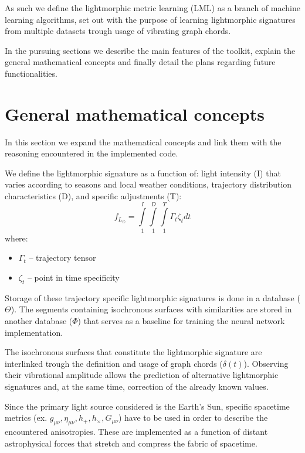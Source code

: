 \documentclass[twoside,11pt]{article}
\begin{document}
As such we define the lightmorphic metric learning (LML) as a branch of machine learning algorithms, set out with the purpose of learning lightmorphic signatures from multiple datasets trough usage of vibrating graph chords.

In the pursuing sections we describe the main features of the toolkit, explain the general mathematical concepts and finally detail the plans regarding future functionalities.
\section{General mathematical concepts}
In this section we expand the mathematical concepts and link them with the reasoning encountered in the implemented code. 

We define the lightmorphic signature as a function of: light intensity (I) that varies according to seasons and local weather conditions, trajectory distribution characteristics (D), and specific adjustments (T):
\begin{equation}  \label{eq:light signature function}
f_{L_{\odot}} =  \int\limits_{1}^{I}\int\limits_{1}^{D}\int\limits_{1}^{T} \Gamma_{t}\zeta_{t}{dt}
\end{equation}
where:
\begin{itemize}
	\item $\Gamma_{t}$ -- trajectory tensor
	\item $\zeta_{t}$ -- point in time specificity
\end{itemize}

Storage of these trajectory specific lightmorphic signatures is done in a database ($\Theta$). The segments containing isochronous surfaces with similarities are stored in another database ($\Phi$) that serves as a baseline for training the neural network implementation. 

The isochronous surfaces that constitute the lightmorphic signature are interlinked trough the definition and usage of graph chords ($\delta(t)$). Observing their vibrational amplitude allows the prediction of alternative lightmorphic signatures and, at the same time, correction of the already known values. 

Since the primary light source considered is the Earth's Sun, specific spacetime metrics (ex. $g_{\mu\nu}, \eta_{\mu\nu}, h_+, h_\times, G_{\mu\nu}$) have to be used in order to describe the encountered anisotropies. These are implemented as a function of distant astrophysical forces that stretch and compress the fabric of spacetime. 
\end{document}
